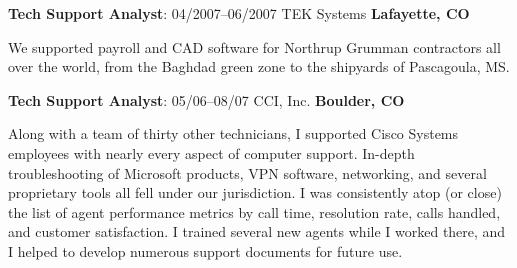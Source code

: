 \documentclass[a4paper,12pt]{article}
\begin{document}
\begin{flushleft}
\textbf{Tech Support Analyst}: 04/2007--06/2007 TEK Systems 
\textbf{Lafayette, CO}
\end{flushleft}

We supported payroll and CAD software for Northrup Grumman contractors all over
the world, from the Baghdad green zone to the shipyards of Pascagoula, MS.

\begin{flushleft}
\textbf{Tech Support Analyst}: 05/06--08/07 CCI, Inc. \textbf{Boulder, CO}
\end{flushleft}

Along with a team of thirty other technicians, I supported Cisco Systems
employees with nearly every aspect of computer support. In-depth
troubleshooting of Microsoft products, VPN software, networking, and several
proprietary tools all fell under our jurisdiction. I was consistently atop
(or close) the list of agent performance metrics by call time, resolution rate,
calls handled, and customer satisfaction. I trained several new agents while
I worked there, and I helped to develop numerous support documents for future
use.
\end{document}
